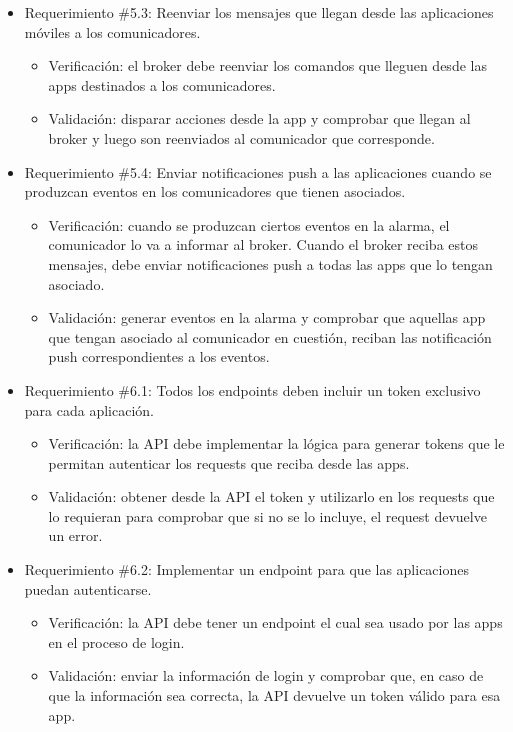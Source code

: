 \documentclass[
11pt, %
]{charter}
\begin{document}
\begin{itemize}
	\item Requerimiento \#5.3: Reenviar los mensajes que llegan desde las aplicaciones móviles a los comunicadores.
	\begin{itemize}
		\item Verificación: el broker debe reenviar los comandos que lleguen desde las apps destinados a los comunicadores.
		\item Validación: disparar acciones desde la app y comprobar que llegan al broker y luego son reenviados al comunicador que corresponde.
	\end{itemize}
			
	\item Requerimiento \#5.4: Enviar notificaciones push a las aplicaciones cuando se produzcan eventos en los comunicadores que tienen asociados.
	\begin{itemize}
		\item Verificación: cuando se produzcan ciertos eventos en la alarma, el comunicador lo va a informar al broker. Cuando el broker reciba estos mensajes, debe enviar notificaciones push a todas las apps que lo tengan asociado.
		\item Validación: generar eventos en la alarma y comprobar que aquellas app que tengan asociado al comunicador en cuestión, reciban las notificación push correspondientes a los eventos.
	\end{itemize}
			
	\item Requerimiento \#6.1: Todos los endpoints deben incluir un token exclusivo para cada aplicación.
	\begin{itemize}
		\item Verificación: la API debe implementar la lógica para generar tokens que le permitan autenticar los requests que reciba desde las apps.
		\item Validación: obtener desde la API el token y utilizarlo en los requests que lo requieran para comprobar que si no se lo incluye, el request devuelve un error.
	\end{itemize}
			
	\item Requerimiento \#6.2: Implementar un endpoint para que las aplicaciones puedan autenticarse.
	\begin{itemize}
		\item Verificación: la API debe tener un endpoint el cual sea usado por las apps en el proceso de login.
		\item Validación: enviar la información de login y comprobar que, en caso de que la información sea correcta, la API devuelve un token válido para esa app.
	\end{itemize}
			

\end{itemize}
\end{document}
